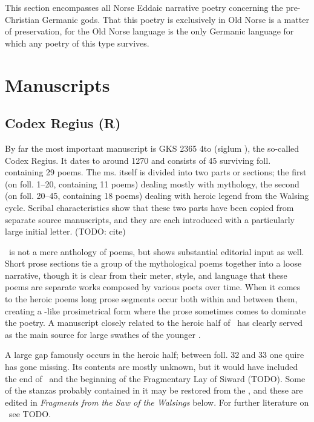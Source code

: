 
This section encompasses all Norse Eddaic narrative poetry concerning the pre-Christian Germanic gods.  That this poetry is exclusively in Old Norse is a matter of preservation, for the Old Norse language is the only Germanic language for which any poetry of this type survives.

\section{Manuscripts}

\subsection{Codex Regius (R)}

By far the most important manuscript is GKS 2365 4to (siglum \Regius), the so-called Codex Regius.  It dates to around 1270 and consists of 45 surviving foll. containing 29 poems.  The ms. itself is divided into two parts or sections; the first (on foll. 1–20, containing 11 poems) dealing mostly with mythology, the second (on foll. 20–45, containing 18 poems) dealing with heroic legend from the Walsing cycle.  Scribal characteristics show that these two parts have been copied from separate source manuscripts, and they are each introduced with a particularly large initial letter. (TODO: cite)

\Regius\ is not a mere anthology of poems, but shows substantial editorial input as well.  Short prose sections tie a group of the mythological poems together into a loose narrative, though it is clear from their meter, style, and language that these poems are separate works composed by various poets over time.  When it comes to the heroic poems long prose segments occur both within and between them, creating a -like prosimetrical form where the prose sometimes comes to dominate the poetry.  A manuscript closely related to the heroic half of \Regius\ has clearly served as the main source for large swathes of the younger \VolsungaSaga.

A large gap famously occurs in the heroic half; between foll. 32 and 33 one quire has gone missing.  Its contents are mostly unknown, but it would have included the end of \Sigrdrifumal\ and the beginning of the Fragmentary Lay of Siward (TODO).  Some of the stanzas probably contained in it may be restored from the \VolsungaSaga, and these are edited in \emph{Fragments from the Saw of the Walsings} below.  For further literature on \Regius\ see TODO.

